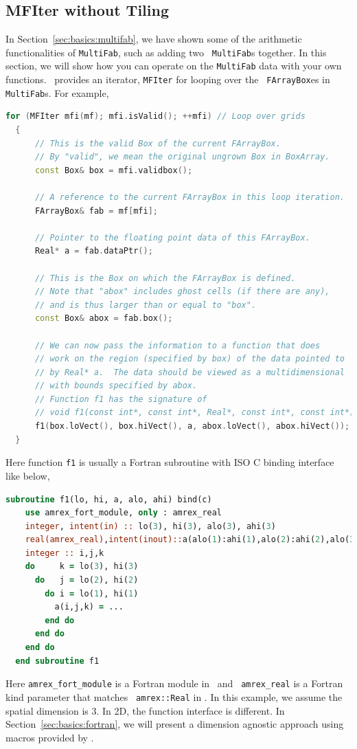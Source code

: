 {{\subsection{MFIter without Tiling}
\label{sec:basics:mfiter:notiling}

In Section~\ref{sec:basics:multifab}, we have shown some of the
arithmetic functionalities of {\tt MultiFab}, such as adding two {\tt
  MultiFab}s together.  In this section, we will show how you can
operate on the {\tt MultiFab} data with your own functions.  \amrex\
provides an iterator, {\tt MFIter} for looping over the {\tt
  FArrayBox}es in {\tt MultiFab}s.  For example,
\begin{lstlisting}[language=cpp]
  for (MFIter mfi(mf); mfi.isValid(); ++mfi) // Loop over grids
  {
      // This is the valid Box of the current FArrayBox.
      // By "valid", we mean the original ungrown Box in BoxArray.
      const Box& box = mfi.validbox();

      // A reference to the current FArrayBox in this loop iteration.
      FArrayBox& fab = mf[mfi];

      // Pointer to the floating point data of this FArrayBox.
      Real* a = fab.dataPtr();

      // This is the Box on which the FArrayBox is defined.
      // Note that "abox" includes ghost cells (if there are any),
      // and is thus larger than or equal to "box".
      const Box& abox = fab.box();

      // We can now pass the information to a function that does
      // work on the region (specified by box) of the data pointed to
      // by Real* a.  The data should be viewed as a multidimensional
      // with bounds specified by abox.
      // Function f1 has the signature of
      // void f1(const int*, const int*, Real*, const int*, const int*);
      f1(box.loVect(), box.hiVect(), a, abox.loVect(), abox.hiVect());
  }
\end{lstlisting}
Here function {\tt f1} is usually a Fortran subroutine with ISO C
binding interface like below,
\begin{lstlisting}[language=fortran]
  subroutine f1(lo, hi, a, alo, ahi) bind(c)
    use amrex_fort_module, only : amrex_real
    integer, intent(in) :: lo(3), hi(3), alo(3), ahi(3)
    real(amrex_real),intent(inout)::a(alo(1):ahi(1),alo(2):ahi(2),alo(3):ahi(3))
    integer :: i,j,k
    do     k = lo(3), hi(3)
      do   j = lo(2), hi(2)
        do i = lo(1), hi(1)
          a(i,j,k) = ...
        end do
      end do
    end do
  end subroutine f1
\end{lstlisting}
Here {\tt amrex\_fort\_module} is a Fortran module in \amrex\ and {\tt
  amrex\_real} is a Fortran kind parameter that matches {\tt
  amrex::Real} in \cpp.  In this example, we assume the spatial
dimension is 3.  In 2D, the function interface is different.  In
Section~\ref{sec:basics:fortran}, we will present a dimension agnostic
approach using macros provided by \amrex.

}}
